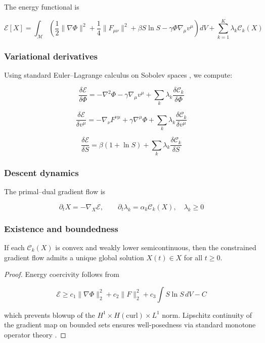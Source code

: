 \documentclass[11pt,a4paper]{article}
\begin{document}
The energy functional is

\[
\mathcal{E}[X] = \int_{\mathcal{M}} \left(
\frac{1}{2} \lVert \nabla \Phi \rVert^2 +
\frac{1}{4} \lVert F_{\mu\nu} \rVert^2 +
\beta S \ln S
- \gamma \Phi \nabla_\mu v^\mu
\right) dV
+ \sum_{k=1}^K \lambda_k \mathcal{C}_k(X)
\]

\subsubsection{Variational derivatives}

Using standard Euler–Lagrange calculus on Sobolev spaces \citep{Evans1998}, we compute:

\[
\frac{\delta \mathcal{E}}{\delta \Phi} = -\nabla^2 \Phi - \gamma \nabla_\mu v^\mu + \sum_k \lambda_k \frac{\delta \mathcal{C}_k}{\delta \Phi}
\]

\[
\frac{\delta \mathcal{E}}{\delta v^\mu} = -\nabla_\nu F^{\nu\mu} + \gamma \nabla^\mu \Phi + \sum_k \lambda_k \frac{\delta \mathcal{C}_k}{\delta v^\mu}
\]

\[
\frac{\delta \mathcal{E}}{\delta S} = \beta(1 + \ln S) + \sum_k \lambda_k \frac{\delta \mathcal{C}_k}{\delta S}
\]

\subsubsection{Descent dynamics}

The primal–dual gradient flow is

\[
\partial_t X = - \nabla_X \mathcal{E}, \qquad
\partial_t \lambda_k = \alpha_k \mathcal{C}_k(X), \quad
\lambda_k \ge 0
\]

\subsubsection{Existence and boundedness}

\begin{theorem}
If each \( \mathcal{C}_k(X) \) is convex and weakly lower semicontinuous, then the constrained gradient flow admits a unique global solution \( X(t) \in X \) for all \( t \ge 0 \).
\end{theorem}

\begin{proof}
Energy coercivity follows from

\[
\mathcal{E} \ge c_1 \|\nabla \Phi\|_2^2 + c_2 \|F\|_2^2 + c_3 \int S \ln S \, dV - C
\]

which prevents blowup of the \(H^1 \times H(\mathrm{curl}) \times L^1\) norm. Lipschitz continuity of the gradient map on bounded sets ensures well-posedness via standard monotone operator theory \citep{Brezis1973}.
\end{proof}
\end{document}
